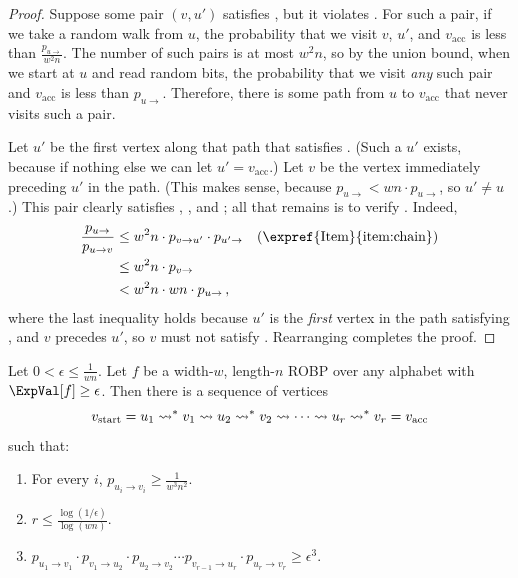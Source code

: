 \begin{proof}
Suppose some pair $(v, u')$ satisfies , but it violates . For such a pair, if we take a random walk from $u$, the probability that we visit $v$, $u'$, and $v_{\text{acc}}$ is less than $\frac{p_{u \to}}{w^2 n}$. The number of such pairs is at most $w^2 n$, so by the union bound, when we start at $u$ and read random bits, the probability that we visit \emph{any} such pair and $v_{\text{acc}}$ is less than $p_{u \to}$. Therefore, there is some path from $u$ to $v_{\text{acc}}$ that never visits such a pair.

Let $u'$ be the first vertex along that path that satisfies . (Such a $u'$ exists, because if nothing else we can let $u' = v_{\text{acc}}$.) Let $v$ be the vertex immediately preceding $u'$ in the path. (This makes sense, because $p_{u \to} < wn \cdot p_{u \to}$, so $u' \neq u$.) This pair clearly satisfies , , and ; all that remains is to verify . Indeed,
\begin{align*}
\frac{p_{u \to}}{p_{u \to v}} &\leq w^2 n \cdot p_{v \to u'} \cdot p_{u' \to} && \text{(\expref{Item}{item:chain})} \\
&\leq w^2 n \cdot p_{v \to} \\
&< w^2 n \cdot wn \cdot p_{u \to}\,,
\end{align*}
where the last inequality holds because $u'$ is the \emph{first} vertex in the path satisfying , and $v$ precedes $u'$, so $v$ must not satisfy . Rearranging completes the proof.
\end{proof}

\begin{corollary} \label{cor:structural}
Let $0 < \epsilon \leq \frac{1}{wn}$. Let $f$ be a width-$w$, length-$n$ ROBP over any alphabet with $\ExpVal[f] \geq \epsilon$. Then there is a sequence of vertices 
$$
v_{\normalfont\text{start}} = u_1 \leadsto^* v_1 \leadsto u_2 \leadsto^* v_2 \leadsto \cdots \leadsto u_r \leadsto^* v_r = v_{\normalfont\text{acc}}
$$
such that:
\begin{enumerate}
\item For every $i$, $p_{u_i \to v_i} \geq \frac{1}{w^3 n^2}$. \label{item:long-hops}
\item $r \leq \frac{\log(1/\epsilon)}{\log(wn)}$. \label{item:full-chain-length}
\item $p_{u_1 \to v_1} \cdot p_{v_1 \to u_2} \cdot p_{u_2 \to v_2} \cdots p_{v_{r - 1} \to u_r} \cdot p_{u_r \to v_r} \geq \epsilon^3$. \label{item:full-chain}
\end{enumerate}
\end{corollary}


